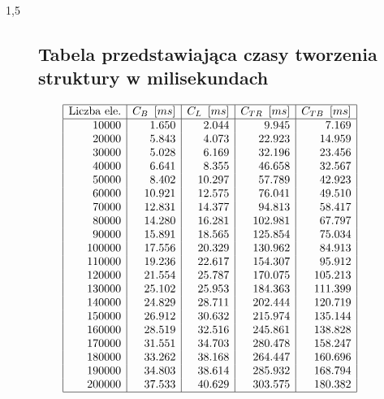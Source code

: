\documentclass[polish,polish,a4paper]{article}
\begin{document}
\begin{spacing}{1,5}
\begin{figure}[H]
		\subsection*{Tabela przedstawiająca czasy tworzenia struktury w milisekundach}
		\centering
		\begin{equation*}
		\begin{array}{|r|r|r|r|r|}
		\hline
		\multicolumn{1}{|c|}{$Liczba ele.$}&\multicolumn{1}{c|}{C_{B}\enskip[ms]}&\multicolumn{1}{c|}{C_{L}\enskip[ms]}&\multicolumn{1}{c|}{C_{TR}\enskip[ms]}&\multicolumn{1}{c|}{C_{TB}\enskip[ms]}\\ \hline
		10000&1.650&2.044&9.945&7.169\\
		20000&5.843&4.073&22.923&14.959\\
		30000&5.028&6.169&32.196&23.456\\
		40000&6.641&8.355&46.658&32.567\\
		50000&8.402&10.297&57.789&42.923\\
		60000&10.921&12.575&76.041&49.510\\
		70000&12.831&14.377&94.813&58.417\\
		80000&14.280&16.281&102.981&67.797\\
		90000&15.891&18.565&125.854&75.034\\
		100000&17.556&20.329&130.962&84.913\\
		110000&19.236&22.617&154.307&95.912\\
		120000&21.554&25.787&170.075&105.213\\
		130000&25.102&25.953&184.363&111.399\\
		140000&24.829&28.711&202.444&120.719\\
		150000&26.912&30.632&215.974&135.144\\
		160000&28.519&32.516&245.861&138.828\\
		170000&31.551&34.703&280.478&158.247\\
		180000&33.262&38.168&264.447&160.696\\
		190000&34.803&38.614&285.932&168.794\\
		200000&37.533&40.629&303.575&180.382\\\hline		
		\end{array}
		\end{equation*}
\end{figure}
\end{spacing}
\end{document}
